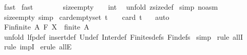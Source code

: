 \begin{isabellebody}
\isamarkupfalse%
\ fast\isanewline
{}\isamarkupfalse%
\ fast\isanewline
{}\isamarkupfalse%
%
\endisatagproof
{\isafoldproof}%
%
\isadelimproof
\isanewline
%
\endisadelimproof
\ \ \ \ \ \ \isanewline
{}\isamarkupfalse%
\ size{\isacharunderscore}empty{\isacharcolon}\ {\isachardoublequoteopen}{\isacharparenleft}{\isacharhash}\ {\isacharbraceleft}{\isacharbraceright}{\isacharparenright}\ {\isacharequal}\ int\ {}{\isachardoublequoteclose}\isanewline
%
\isadelimproof
%
\endisadelimproof
%
\isatagproof
{}\isamarkupfalse%
\ {\isacharparenleft}unfold\ zsize{\isacharunderscore}def{\isacharparenright}\isanewline
{}\isamarkupfalse%
\ {\isacharparenleft}simp\ {\isacharparenleft}no{\isacharunderscore}asm{\isacharparenright}{\isacharparenright}\isanewline
{}\isamarkupfalse%
%
\endisatagproof
{\isafoldproof}%
%
\isadelimproof
\isanewline
%
\endisadelimproof
{}\isamarkupfalse%
\ size{\isacharunderscore}empty\ {\isacharbrackleft}simp{\isacharbrackright}\isanewline
\isanewline
{}\isamarkupfalse%
\ card{\isacharunderscore}empty{\isacharunderscore}set{\isacharcolon}\ {\isachardoublequoteopen}{\isacharparenleft}t\ {\isacharequal}\ {\isacharbraceleft}{\isacharbraceright}{\isacharparenright}\ {\isacharequal}{\isacharequal}{\isachargreater}\ {\isacharparenleft}card\ t\ {\isacharequal}\ {}{\isacharparenright}{\isachardoublequoteclose}\isanewline
%
\isadelimproof
%
\endisadelimproof
%
\isatagproof
{}\isamarkupfalse%
\ auto\isanewline
{}\isamarkupfalse%
%
\endisatagproof
{\isafoldproof}%
%
\isadelimproof
\isanewline
%
\endisadelimproof
\isanewline
\isanewline
{}\isamarkupfalse%
\ Fin{\isacharunderscore}finite{\isacharcolon}\ {\isachardoublequoteopen}A{\isacharcolon}\ {\isacharpercent}F\ X\ {\isacharequal}{\isacharequal}{\isachargreater}\ finite\ A{\isachardoublequoteclose}\isanewline
%
\isadelimproof
%
\endisadelimproof
%
\isatagproof
{}\isamarkupfalse%
\ {\isacharparenleft}unfold\ lfp{\isacharunderscore}def\ insert{\isacharunderscore}def\ Un{\isacharunderscore}def\ Inter{\isacharunderscore}def\ Finites{\isachardot}defs\ Fin{\isachardot}defs{\isacharparenright}\isanewline
{}\isamarkupfalse%
\ simp\isanewline
{}\isamarkupfalse%
\ {\isacharparenleft}rule\ allI{\isacharparenright}\isanewline
{}\isamarkupfalse%
\ {\isacharparenleft}rule\ impI{\isacharparenright}\isanewline
{}\isamarkupfalse%
\ {\isacharparenleft}erule\ allE{\isacharparenright}\isanewline

\end{isabellebody}
